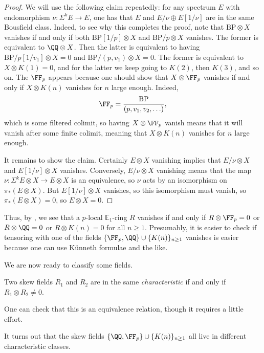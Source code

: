 \documentclass[../notes.tex]{subfiles}
\begin{document}
\begin{proof}
	We will use the following claim repeatedly: for any spectrum $E$ with endomorphism $\nu\colon\Sigma^kE\to E$, one has that $E$ and $E/\nu\oplus E[1/\nu]$ are in the same Bousfield class. Indeed, to see why this completes the proof, note that $\mathrm{BP}\otimes X$ vanishes if and only if both $\mathrm{BP}[1/p]\otimes X$ and $\mathrm{BP}/p\otimes X$ vanishes. The former is equivalent to $\QQ\otimes X$. Then the latter is equivalent to having $\mathrm{BP}/p[1/v_1]\otimes X=0$ and $\mathrm{BP}/(p,v_1)\otimes X=0$. The former is equivalent to $X\otimes K(1)=0$, and for the latter we keep going to $K(2)$, then $K(3)$, and so on. The $\FF_p$ appears because one should show that $X\otimes\FF_p$ vanishes if and only if $X\otimes K(n)$ vanishes for $n$ large enough. Indeed,
	\[\FF_p=\frac{\mathrm{BP}}{(p,v_1,v_2,\ldots)},\]
	which is some filtered colimit, so having $X\otimes\FF_p$ vanish means that it will vanish after some finite colimit, meaning that $X\otimes K(n)$ vanishes for $n$ large enough.

	It remains to show the claim. Certainly $E\otimes X$ vanishing implies that $E/\nu\otimes X$ and $E[1/\nu]\otimes X$ vanishes. Conversely, $E/\nu\otimes X$ vanishing means that the map $\nu\colon\Sigma^kE\otimes X\to E\otimes X$ is an equivalence, so $\nu$ acts by an isomorphism on $\pi_*(E\otimes X)$. But $E[1/\nu]\otimes X$ vanishes, so this isomorphism must vanish, so $\pi_*(E\otimes X)=0$, so $E\otimes X=0$.
\end{proof}
\begin{remark} \label{rem:check-ring-vanish-morava}
	Thus, by , we see that a $p$-local $\mathbb E_1$-ring $R$ vanishes if and only if $R\otimes\FF_p=0$ or $R\otimes\QQ=0$ or $R\otimes K(n)=0$ for all $n\ge1$. Presumably, it is easier to check if tensoring with one of the fields $\{\FF_p,\QQ\}\cup\{K(n)\}_{n\ge1}$ vanishes is easier because one can use K\"unneth formulae and the like.
\end{remark}
We are now ready to classify some fields.
\begin{definition}[characteristic]
	Two skew fields $R_1$ and $R_2$ are in the same \textit{characteristic} if and only if $R_1\otimes R_2\ne0$.
\end{definition}
One can check that this is an equivalence relation, though it requires a little effort.
\begin{remark}
	It turns out that the skew fields $\{\QQ,\FF_p\}\cup\{K(n)\}_{n\ge1}$ all live in different characteristic classes.
\end{remark}
\end{document}
